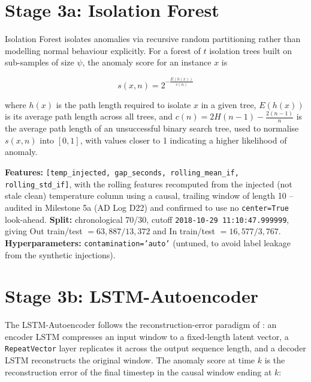 \documentclass[11pt,a4paper,oneside]{report}
\begin{document}
\section{Stage 3a: Isolation Forest}
\label{sec:methodology_if}

Isolation Forest \parencite{liu2008isolation} isolates anomalies via recursive random partitioning rather than modelling normal behaviour explicitly. For a forest of $t$ isolation trees built on sub-samples of size $\psi$, the anomaly score for an instance $x$ is

\begin{equation}
s(x, n) = 2^{-\frac{E(h(x))}{c(n)}}
\label{eq:if_score}
\end{equation}

where $h(x)$ is the path length required to isolate $x$ in a given tree, $E(h(x))$ is its average path length across all trees, and $c(n) = 2H(n-1) - \frac{2(n-1)}{n}$ is the average path length of an unsuccessful binary search tree, used to normalise $s(x,n)$ into $[0,1]$, with values closer to 1 indicating a higher likelihood of anomaly.

{\raggedright \textbf{Features:} \texttt{[temp\_injected, gap\_seconds, rolling\_mean\_if, rolling\_std\_if]}, with the rolling features recomputed from the injected (not stale clean) temperature column using a causal, trailing window of length 10 -- audited in Milestone 5a (AD Log D22) and confirmed to use no \texttt{center=True} look-ahead. \textbf{Split:} chronological 70/30, cutoff \texttt{2018-10-29 11:10:47.999999}, giving Out train/test $= 63{,}887 / 13{,}372$ and In train/test $= 16{,}577 / 3{,}767$. \textbf{Hyperparameters:} \texttt{contamination='auto'} (untuned, to avoid label leakage from the synthetic injections).\par}

\section{Stage 3b: LSTM-Autoencoder}
\label{sec:methodology_lstm}

The LSTM-Autoencoder follows the reconstruction-error paradigm of \textcite{malhotra2016lstm}: an encoder LSTM compresses an input window to a fixed-length latent vector, a \texttt{RepeatVector} layer replicates it across the output sequence length, and a decoder LSTM reconstructs the original window. The anomaly score at time $k$ is the reconstruction error of the final timestep in the causal window ending at $k$:
\end{document}
